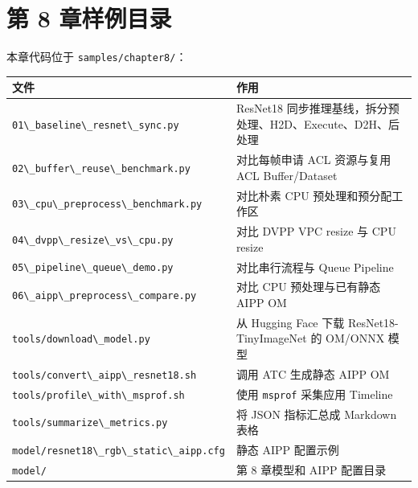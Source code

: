 \section{第 8 章样例目录}\label{src-book-chapter8-h2}

本章代码位于 \passthrough{\lstinline!samples/chapter8/!}：

\begin{longtable}[]{@{}
  >{\raggedright\arraybackslash}p{}
  >{\raggedright\arraybackslash}p{}@{}}
\toprule\noalign{}
\begin{minipage}[b]{\linewidth}\raggedright
文件
\end{minipage} & \begin{minipage}[b]{\linewidth}\raggedright
作用
\end{minipage} \\
\midrule\noalign{}
\endhead
\bottomrule\noalign{}
\endlastfoot
\passthrough{\lstinline!01\_baseline\_resnet\_sync.py!} & ResNet18
同步推理基线，拆分预处理、H2D、Execute、D2H、后处理 \\
\passthrough{\lstinline!02\_buffer\_reuse\_benchmark.py!} & 对比每帧申请
ACL 资源与复用 ACL Buffer/Dataset \\
\passthrough{\lstinline!03\_cpu\_preprocess\_benchmark.py!} & 对比朴素
CPU 预处理和预分配工作区 \\
\passthrough{\lstinline!04\_dvpp\_resize\_vs\_cpu.py!} & 对比 DVPP VPC
resize 与 CPU resize \\
\passthrough{\lstinline!05\_pipeline\_queue\_demo.py!} & 对比串行流程与
Queue Pipeline \\
\passthrough{\lstinline!06\_aipp\_preprocess\_compare.py!} & 对比 CPU
预处理与已有静态 AIPP OM \\
\passthrough{\lstinline!tools/download\_model.py!} & 从 Hugging Face
下载 ResNet18-TinyImageNet 的 OM/ONNX 模型 \\
\passthrough{\lstinline!tools/convert\_aipp\_resnet18.sh!} & 调用 ATC
生成静态 AIPP OM \\
\passthrough{\lstinline!tools/profile\_with\_msprof.sh!} & 使用
\passthrough{\lstinline!msprof!} 采集应用 Timeline \\
\passthrough{\lstinline!tools/summarize\_metrics.py!} & 将 JSON
指标汇总成 Markdown 表格 \\
\passthrough{\lstinline!model/resnet18\_rgb\_static\_aipp.cfg!} & 静态
AIPP 配置示例 \\
\passthrough{\lstinline!model/!} & 第 8 章模型和 AIPP 配置目录 \\
\end{longtable}

